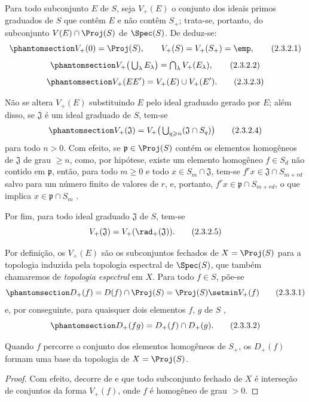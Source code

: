 \documentclass[oneside,10pt]{amsart}
\renewcommand{\geq}{\geqslant}
\newcommand{\oldpage}[2][]{\marginnote{\normalfont\footnotesize\textbf{#1}~|~#2}\ignorespaces}
\let\EGAOriginalLabel\label
\renewcommand{\label}[1]{\phantomsection\EGAOriginalLabel{#1}}
\begin{document}
\begin{env}[2.3.2]
\label{II.2.3.2}
Para todo subconjunto $E$ de $S$, seja $V_+(E)$ o conjunto dos ideais primos graduados de $S$ que contêm $E$ e não contêm $S_+$; trata-se, portanto, do subconjunto $V(E)\cap\Proj(S)$ de $\Spec(S)$.
De  deduz-se:
\[
\label{II.2.3.2.1}
  V_+(0)=\Proj(S),\qquad V_+(S)=V_+(S_+)=\emp,
\tag{2.3.2.1}
\]
\[
\label{II.2.3.2.2}
  V_+\big(\textstyle\bigcup_\lambda E_\lambda\big)
  =\textstyle\bigcap_\lambda V_+(E_\lambda),
\tag{2.3.2.2}
\]
\[
\label{II.2.3.2.3}
  V_+(EE')=V_+(E)\cup V_+(E').
\tag{2.3.2.3}
\]

Não se altera $V_+(E)$ substituindo $E$ pelo ideal graduado gerado por $E$; além disso, se $\mathfrak{J}$ é um ideal graduado de $S$, tem-se
\[
\label{II.2.3.2.4}
  V_+(\mathfrak{J})
  =V_+\big(\textstyle\bigcup_{q\geq n}(\mathfrak{J}\cap S_q)\big)
\tag{2.3.2.4}
\]
\oldpage[II]{26}
para todo $n>0$.
Com efeito, se $\mathfrak{p}\in\Proj(S)$ contém os elementos homogêneos de $\mathfrak{J}$ de grau $\geq n$, como, por hipótese, existe um elemento homogêneo $f\in S_d$ não contido em $\mathfrak{p}$, então, para todo $m\geq0$ e todo $x\in S_m\cap\mathfrak{J}$, tem-se $f^rx\in\mathfrak{J}\cap S_{m+rd}$ salvo para um número finito de valores de $r$, e, portanto, $f^rx\in\mathfrak{p}\cap S_{m+rd}$, o que implica $x\in\mathfrak{p}\cap S_m$ .

Por fim, para todo ideal graduado $\mathfrak{J}$ de $S$, tem-se
\[
  V_+(\mathfrak{J})=V_+(\rad_+(\mathfrak{J})).
\tag{2.3.2.5}
\]
\end{env}

\begin{env}[2.3.3]
\label{II.2.3.3}
Por definição, os $V_+(E)$ são os subconjuntos fechados de $X=\Proj(S)$ para a topologia induzida pela topologia espectral de $\Spec(S)$, que também chamaremos de \emph{topologia espectral} em $X$.
Para todo $f\in S$, põe-se
\[
\label{II.2.3.3.1}
  D_+(f)=D(f)\cap\Proj(S)=\Proj(S)\setmin V_+(f)
\tag{2.3.3.1}
\]
e, por conseguinte, para quaisquer dois elementos $f$, $g$ de $S$ ,
\[
\label{II.2.3.3.2}
  D_+(fg)=D_+(f)\cap D_+(g).
\tag{2.3.3.2}
\]
\end{env}

\begin{proposition}[2.3.4]
\label{II.2.3.4}
Quando $f$ percorre o conjunto dos elementos homogêneos de $S_+$, os $D_+(f)$ formam uma base da topologia de $X=\Proj(S)$.
\end{proposition}

\begin{proof}
Com efeito, decorre de  e  que todo subconjunto fechado de $X$ é interseção de conjuntos da forma $V_+(f)$, onde $f$ é homogêneo de grau $>0$.
\end{proof}
\end{document}
